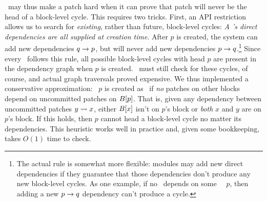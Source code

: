 \Featherstitch\ may thus make a patch hard when it can prove that patch
 will never be the head of a block-level cycle.
%
This requires two tricks.
%
First, an API restriction allows us to search for \emph{existing},
 rather than future, block-level cycles:
%
\emph{A \patch's direct dependencies are all supplied at creation time}.
%
After $p$ is created, the system can add new dependencies $q \rightarrow p$,
 but will never add new dependencies $p \rightarrow q$.\footnote{The actual
 rule is somewhat more flexible: modules may add new direct dependencies if
 they guarantee that those dependencies don't produce any new block-level
 cycles.  As one example, if no \patch\ depends on some \noop\ \patch\ $p$,
 then adding a new $p \rightarrow q$ dependency can't produce a cycle.}
%
Since every \patch\ follows this rule, all possible block-level cycles with
 head $p$ are present in the dependency graph when $p$ is created.
%
\Featherstitch\ must still check for these cycles, of course, and
%
actual graph traversals proved expensive.
%
We thus implemented a conservative approximation: \patch\ $p$ is
created as \nrb\ if \emph{no} patches on other blocks depend on uncommitted
 patches on $B[{p}]$.
%
That is, given any dependency between uncommitted patches $y \leadsto x$,
 either $B[{x}]$ isn't on $p$'s block or \emph{both} $x$ and $y$ are on
 $p$'s block.
%
If this holds, then $p$ cannot head a block-level cycle no matter its
 dependencies.
%
This heuristic works well in practice and, given some bookkeeping, 
 takes $O(1)$ time to check.


\begin{comment}
\Kudos\ further ensures that the dependency structure correctly
represents dependencies on the same block through overlap
dependencies: since \nrb\ \patches\ are considered to cover the entire
block, every succeeding \patch\ will overlap at least one \nrb\ \patch,
and \Kudos\ will automatically add a dependency.
%
(Some cases are handled by other optimizations.)


The buffer cache's ``write block'' behavior must account for \nrb\
\patches, as it \emph{must} write any \nrb\ \patches\ that exist on a
block.
%
Let $\PHard[b]$ be the set of \nrb\ \patches\ on block $b$.
%
Then to write block $b$, the buffer cache must choose some $P \subseteq
\PMem[b]$ with
%
\[ \PDepset{P} \subseteq P \cup \PDisk \text{ and } \PHard[b] \cap \PMem
\subseteq P. \]
%
If no such $P$ exists, then the cache must write a different block.
\end{comment}


